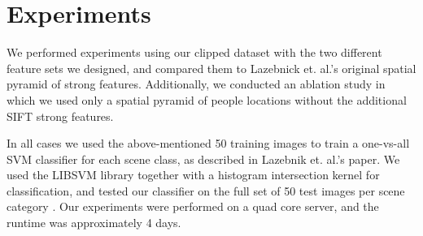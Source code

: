 \documentclass[11pt]{article}
\begin{document}



\section{Experiments}
We performed experiments using our clipped dataset with the two different feature sets we designed, and compared them to Lazebnick et. al.'s original spatial pyramid of strong features. Additionally, we conducted an ablation study in which we used only a spatial pyramid of people locations without the additional SIFT strong features.

In all cases we used the above-mentioned 50 training images to train a one-vs-all SVM classifier for each scene class, as described in Lazebnik et. al.'s paper. We used the LIBSVM library together with a histogram intersection kernel for classification, and tested our classifier on the full set of 50 test images per scene category \cite{libsvm}. Our experiments were performed on a quad core server, and the runtime was approximately 4 days.
\end{document}
